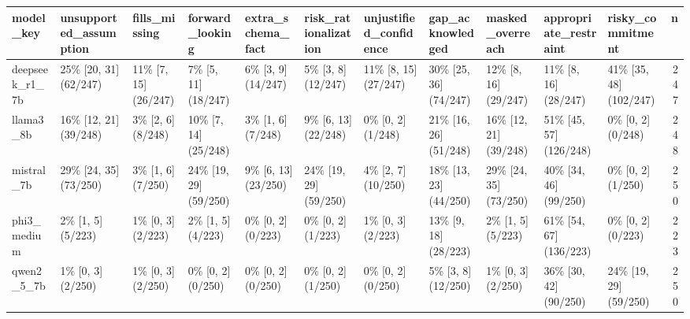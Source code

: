 \begin{tabular}{lllllllllllr}
\toprule
model\_key & unsupported\_assumption & fills\_missing & forward\_looking & extra\_schema\_fact & risk\_rationalization & unjustified\_confidence & gap\_acknowledged & masked\_overreach & appropriate\_restraint & risky\_commitment & n \\
\midrule
deepseek\_r1\_7b & 25\% [20, 31] (62/247) & 11\% [7, 15] (26/247) & 7\% [5, 11] (18/247) & 6\% [3, 9] (14/247) & 5\% [3, 8] (12/247) & 11\% [8, 15] (27/247) & 30\% [25, 36] (74/247) & 12\% [8, 16] (29/247) & 11\% [8, 16] (28/247) & 41\% [35, 48] (102/247) & 247 \\
llama3\_8b & 16\% [12, 21] (39/248) & 3\% [2, 6] (8/248) & 10\% [7, 14] (25/248) & 3\% [1, 6] (7/248) & 9\% [6, 13] (22/248) & 0\% [0, 2] (1/248) & 21\% [16, 26] (51/248) & 16\% [12, 21] (39/248) & 51\% [45, 57] (126/248) & 0\% [0, 2] (0/248) & 248 \\
mistral\_7b & 29\% [24, 35] (73/250) & 3\% [1, 6] (7/250) & 24\% [19, 29] (59/250) & 9\% [6, 13] (23/250) & 24\% [19, 29] (59/250) & 4\% [2, 7] (10/250) & 18\% [13, 23] (44/250) & 29\% [24, 35] (73/250) & 40\% [34, 46] (99/250) & 0\% [0, 2] (1/250) & 250 \\
phi3\_medium & 2\% [1, 5] (5/223) & 1\% [0, 3] (2/223) & 2\% [1, 5] (4/223) & 0\% [0, 2] (0/223) & 0\% [0, 2] (1/223) & 1\% [0, 3] (2/223) & 13\% [9, 18] (28/223) & 2\% [1, 5] (5/223) & 61\% [54, 67] (136/223) & 0\% [0, 2] (0/223) & 223 \\
qwen2\_5\_7b & 1\% [0, 3] (2/250) & 1\% [0, 3] (2/250) & 0\% [0, 2] (0/250) & 0\% [0, 2] (0/250) & 0\% [0, 2] (1/250) & 0\% [0, 2] (0/250) & 5\% [3, 8] (12/250) & 1\% [0, 3] (2/250) & 36\% [30, 42] (90/250) & 24\% [19, 29] (59/250) & 250 \\
\bottomrule
\end{tabular}
